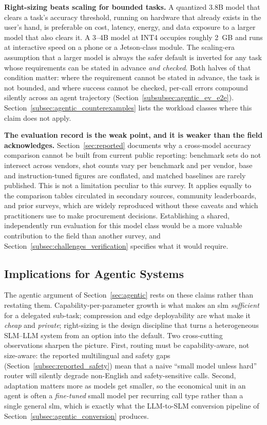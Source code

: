 \textbf{Right-sizing beats scaling for bounded tasks.} A quantized 3.8B model
that clears a task's accuracy threshold, running on hardware that already exists
in the user's hand, is preferable on cost, latency, energy, and data exposure to
a larger model that also clears it. A 3--4B model at INT4 occupies roughly 2~GB
and runs at interactive speed on a phone or a Jetson-class module. The
scaling-era assumption that a larger model is always the safer default is
inverted for any task whose requirements can be stated in advance \emph{and
checked}. Both halves of that condition matter: where the requirement cannot be
stated in advance, the task is not bounded, and where success cannot be checked,
per-call errors compound silently across an agent trajectory
(Section~\ref{subsubsec:agentic_ev_e2e}). Section~\ref{subsec:agentic_counterexamples}
lists the workload classes where this claim does not apply.

\textbf{The evaluation record is the weak point, and it is weaker than the field
acknowledges.} Section~\ref{sec:reported} documents why a cross-model accuracy
comparison cannot be built from current public reporting: benchmark sets do not
intersect across vendors, shot counts vary per benchmark and per vendor, base and
instruction-tuned figures are conflated, and matched baselines are rarely
published. This is not a limitation peculiar to this survey. It applies equally
to the comparison tables circulated in secondary sources, community leaderboards,
and prior surveys, which are widely reproduced without these caveats and which
practitioners use to make procurement decisions. Establishing a shared,
independently run evaluation for this model class would be a more valuable
contribution to the field than another survey, and
Section~\ref{subsec:challenges_verification} specifies what it would require.

\subsection{Implications for Agentic Systems}
\label{subsec:discussion_agentic}

The agentic argument of Section~\ref{sec:agentic} rests on these claims rather
than restating them. Capability-per-parameter growth is what makes an \gls{slm}
\emph{sufficient} for a delegated sub-task; compression and edge deployability are
what make it \emph{cheap} and \emph{private}; right-sizing is the design
discipline that turns a heterogeneous SLM--LLM system from an option into the
default. Two cross-cutting observations sharpen the picture. First, routing must
be capability-aware, not size-aware: the reported multilingual and safety gaps
(Section~\ref{subsec:reported_safety}) mean that a naive ``small model unless
hard'' router will silently degrade non-English and safety-sensitive calls.
Second, adaptation matters more as models get smaller, so the economical unit in
an agent is often a \emph{fine-tuned} small model per recurring call type rather
than a single general \gls{slm}, which is exactly what the LLM-to-SLM conversion
pipeline of Section~\ref{subsec:agentic_conversion} produces.

